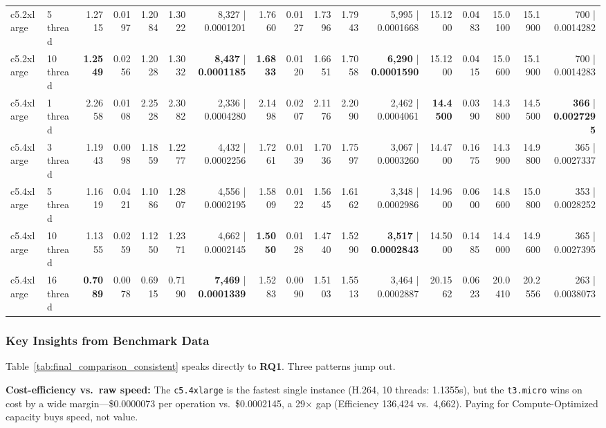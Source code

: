 \documentclass[conference]{IEEEtran}
\begin{document}
\begin{table}[h]
{\begin{tabular}{ll|rrrrr|rrrrr|rrrrr}
			c5.2xlarge & 5 thread & 1.2715 & 0.0197 & 1.2084 & 1.3022 & 8,327 | 0.0001201 & 1.7660 & 0.0127 & 1.7396 & 1.7943 & 5,995 | 0.0001668 & 15.1200 & 0.0483 & 15.0100 & 15.1900 & 700 | 0.0014282 \\
			c5.2xlarge & 10 thread & \textbf{1.2549} & 0.0256 & 1.2028 & 1.3032 & \textbf{8,437} | \textbf{0.0001185} & \textbf{1.6833} & 0.0120 & 1.6651 & 1.7058 & \textbf{6,290} | \textbf{0.0001590} & 15.1200 & 0.0415 & 15.0600 & 15.1900 & 700 | 0.0014283 \\
			\midrule
			c5.4xlarge & 1 thread & 2.2658 & 0.0108 & 2.2528 & 2.3082 & 2,336 | 0.0004280 & 2.1498 & 0.0207 & 2.1176 & 2.2090 & 2,462 | 0.0004061 & \textbf{14.4500} & 0.0390 & 14.3800 & 14.5500 & \textbf{366} | \textbf{0.0027295} \\
			c5.4xlarge & 3 thread & 1.1943 & 0.0098 & 1.1859 & 1.2277 & 4,432 | 0.0002256 & 1.7261 & 0.0139 & 1.7036 & 1.7597 & 3,067 | 0.0003260 & 14.4700 & 0.1675 & 14.3900 & 14.9800 & 365 | 0.0027337 \\
			c5.4xlarge & 5 thread & 1.1619 & 0.0421 & 1.1086 & 1.2807 & 4,556 | 0.0002195 & 1.5809 & 0.0122 & 1.5645 & 1.6162 & 3,348 | 0.0002986 & 14.9600 & 0.0600 & 14.8600 & 15.0800 & 353 | 0.0028252 \\
			c5.4xlarge & 10 thread & 1.1355 & 0.0259 & 1.1250 & 1.2371 & 4,662 | 0.0002145 & \textbf{1.5050} & 0.0128 & 1.4740 & 1.5290 & \textbf{3,517} | \textbf{0.0002843} & 14.5000 & 0.1485 & 14.4000 & 14.9600 & 365 | 0.0027395 \\
			c5.4xlarge & 16 thread & \textbf{0.7089} & 0.0078 & 0.6915 & 0.7190 & \textbf{7,469} | \textbf{0.0001339} & 1.5283 & 0.0090 & 1.5103 & 1.5513 & 3,464 | 0.0002887 & 20.1562 & 0.0623 & 20.0410 & 20.2556 & 263 | 0.0038073 \\
			\bottomrule
		\end{tabular}
	}
\end{table}

\subsubsection{Key Insights from Benchmark Data}

Table~\ref{tab:final_comparison_consistent} speaks directly to \textbf{RQ1}. Three patterns jump out.

\textbf{Cost-efficiency vs.\ raw speed:} The \texttt{c5.4xlarge} is the fastest single instance (H.264, 10 threads: 1.1355s), but the \texttt{t3.micro} wins on cost by a wide margin---\$0.0000073 per operation vs.\ \$0.0002145, a 29$\times$ gap (Efficiency 136,424 vs.\ 4,662). Paying for Compute-Optimized capacity buys speed, not value.
\end{document}
